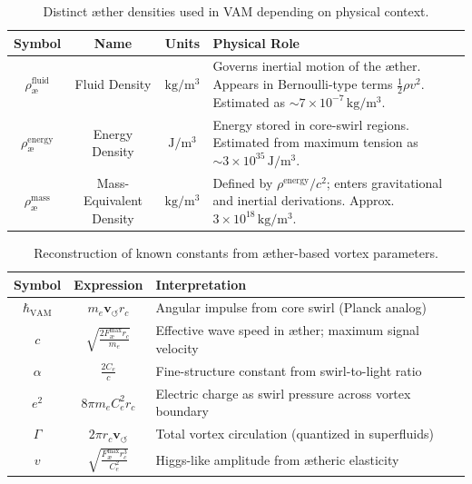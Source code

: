 \documentclass[12pt]{article}
\begin{document}
\begin{table}[H]
\centering
\footnotesize
\renewcommand{\arraystretch}{1.3}
\begin{tabular}{|c|c|c|p{7.5cm}|}
\hline
\textbf{Symbol} & \textbf{Name} & \textbf{Units} & \textbf{Physical Role} \\
\hline
\( \rho_\text{\ae}^{\text{fluid}} \) & Fluid Density & \( \mathrm{kg/m^3} \) & Governs inertial motion of the æther. Appears in Bernoulli-type terms \( \frac{1}{2} \rho v^2 \). Estimated as \( \sim 7 \times 10^{-7} \, \mathrm{kg/m^3} \). \\
\hline
\( \rho_\text{\ae}^{\text{energy}} \) & Energy Density & \( \mathrm{J/m^3} \) & Energy stored in core-swirl regions. Estimated from maximum tension as \( \sim 3 \times 10^{35} \, \mathrm{J/m^3} \). \\
\hline
\( \rho_\text{\ae}^{\text{mass}} \) & Mass-Equivalent Density & \( \mathrm{kg/m^3} \) & Defined by \( \rho^{\text{energy}} / c^2 \); enters gravitational and inertial derivations. Approx.\ \( 3 \times 10^{18} \, \mathrm{kg/m^3} \). \\
\hline
\end{tabular}
\caption{Distinct æther densities used in VAM depending on physical context.}
\label{tab:ae_densities_foot}
\end{table}

\begin{table}[H]
    \centering
    \footnotesize
    \renewcommand{\arraystretch}{1.3}
    \begin{tabular}{|c|c|l|}
        \hline
        \textbf{Symbol} & \textbf{Expression} & \textbf{Interpretation} \\
        \hline
        \( \hbar_{\text{VAM}} \) & \( m_e \mathbf{v}_{\scriptscriptstyle\boldsymbol{\circlearrowleft}} r_c \) & Angular impulse from core swirl (Planck analog) \\
        \hline
        \( c \) & \( \sqrt{\frac{2 F^{\text{max}}_{\text{\ae}} r_c}{m_e}} \) & Effective wave speed in æther; maximum signal velocity \\
        \hline
        \( \alpha \) & \( \frac{2 C_e}{c} \) & Fine-structure constant from swirl-to-light ratio \\
        \hline
        \( e^2 \) & \( 8\pi m_e C_e^2 r_c \) & Electric charge as swirl pressure across vortex boundary \\
        \hline
        \( \Gamma \) & \( 2\pi r_c \mathbf{v}_{\scriptscriptstyle\boldsymbol{\circlearrowleft}} \) & Total vortex circulation (quantized in superfluids) \\
        \hline
        \( v \) & \( \sqrt{\frac{F^{\text{max}}_{\text{\ae}} r_c^3}{C_e^2}} \) & Higgs-like amplitude from ætheric elasticity \\
        \hline
    \end{tabular}
    \caption{Reconstruction of known constants from æther-based vortex parameters.}
    \label{tab:VAM_constants}
\end{table}
\end{document}
